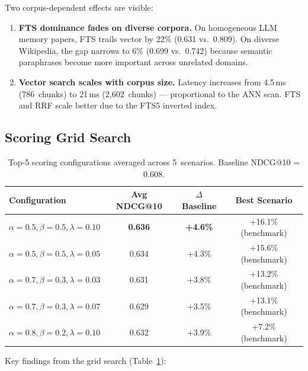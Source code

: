\documentclass[11pt,a4paper]{article}
\begin{document}
Two corpus-dependent effects are visible:

\begin{enumerate}
  \item \textbf{FTS dominance fades on diverse corpora.}  On
    homogeneous LLM memory papers, FTS trails vector by 22\%
    (0.631 vs.\ 0.809).  On diverse Wikipedia, the gap narrows
    to 6\% (0.699 vs.\ 0.742) because semantic paraphrases
    become more important across unrelated domains.
  \item \textbf{Vector search scales with corpus size.}  Latency
    increases from 4.5\,ms (786~chunks) to 21\,ms (2{,}602~chunks)
    --- proportional to the ANN scan.  FTS and RRF scale better
    due to the FTS5 inverted index.
\end{enumerate}


\subsection{Scoring Grid Search}

\begin{table}[t]
  \centering
  \caption{Top-5 scoring configurations averaged across 5~scenarios.
    Baseline NDCG@10 = 0.608.}
  \label{tab:scoring}
  \begin{tabular}{lccc}
    \toprule
    Configuration & Avg NDCG@10 & $\Delta$ Baseline & Best Scenario \\
    \midrule
    $\alpha{=}0.5, \beta{=}0.5, \lambda{=}0.10$ &
      \textbf{0.636} & \textbf{+4.6\%} & +16.1\% (benchmark) \\
    $\alpha{=}0.5, \beta{=}0.5, \lambda{=}0.05$ &
      0.634 & +4.3\% & +15.6\% (benchmark) \\
    $\alpha{=}0.7, \beta{=}0.3, \lambda{=}0.03$ &
      0.631 & +3.8\% & +13.2\% (benchmark) \\
    $\alpha{=}0.7, \beta{=}0.3, \lambda{=}0.07$ &
      0.629 & +3.5\% & +13.1\% (benchmark) \\
    $\alpha{=}0.8, \beta{=}0.2, \lambda{=}0.10$ &
      0.632 & +3.9\% & +7.2\% (benchmark) \\
    \bottomrule
  \end{tabular}
\end{table}

Key findings from the grid search (Table~\ref{tab:scoring}):
\end{document}
